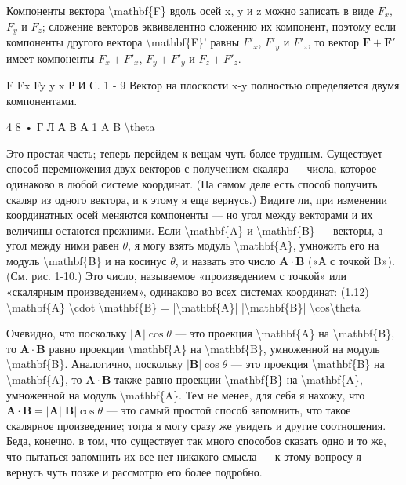 \documentclass[10pt,oneside]{article}
\begin{document}
Компоненты вектора \textbackslash{}mathbf\{F\} вдоль осей x, y и z можно записать в виде \(F_x\), \(F_y\) и \(F_z\); сложение векторов эквивалентно сложению их компонент, поэтому если компоненты другого вектора \textbackslash{}mathbf\{F\}' равны \(F'_x\), \(F'_y\) и \(F'_z\), то вектор \(\mathbf{F} + \mathbf{F}'\) имеет компоненты \(F_x + F'_x\), \(F_y + F'_y\) и \(F_z + F'_z\).\par

F Fx Fy y x Р И С. 1 - 9 Вектор на плоскости x-y полностью определяется двумя компонентами.\par

4 8 • Г Л А В А   1 A B \textbackslash{}theta\par

Это простая часть; теперь перейдем к вещам чуть более трудным. Существует способ перемножения двух векторов с получением скаляра --- числа, которое одинаково в любой системе координат. (На самом деле есть способ получить скаляр из одного вектора, и к этому я еще вернусь.) Видите ли, при изменении координатных осей меняются компоненты --- но угол между векторами и их величины остаются прежними. Если \textbackslash{}mathbf\{A\} и \textbackslash{}mathbf\{B\} --- векторы, а угол между ними равен \(\theta\), я могу взять модуль \textbackslash{}mathbf\{A\}, умножить его на модуль \textbackslash{}mathbf\{B\} и на косинус \(\theta\), и назвать это число \(\mathbf{A} \cdot \mathbf{B}\) («А с точкой B»). (См. рис. 1-10.) Это число, называемое «произведением с точкой» или «скалярным произведением», одинаково во всех системах координат: (1.12) \textbackslash{}mathbf\{A\} \textbackslash{}cdot \textbackslash{}mathbf\{B\} = |\textbackslash{}mathbf\{A\}| |\textbackslash{}mathbf\{B\}| \textbackslash{}cos\textbackslash{}theta\par

Очевидно, что поскольку \(|\mathbf{A}| \cos\theta\) --- это проекция \textbackslash{}mathbf\{A\} на \textbackslash{}mathbf\{B\}, то \(\mathbf{A} \cdot \mathbf{B}\) равно проекции \textbackslash{}mathbf\{A\} на \textbackslash{}mathbf\{B\}, умноженной на модуль \textbackslash{}mathbf\{B\}. Аналогично, поскольку \(|\mathbf{B}| \cos\theta\) --- это проекция \textbackslash{}mathbf\{B\} на \textbackslash{}mathbf\{A\}, то \(\mathbf{A} \cdot \mathbf{B}\) также равно проекции \textbackslash{}mathbf\{B\} на \textbackslash{}mathbf\{A\}, умноженной на модуль \textbackslash{}mathbf\{A\}. Тем не менее, для себя я нахожу, что \(\mathbf{A} \cdot \mathbf{B} = |\mathbf{A}| |\mathbf{B}| \cos\theta\) --- это самый простой способ запомнить, что такое скалярное произведение; тогда я могу сразу же увидеть и другие соотношения. Беда, конечно, в том, что существует так много способов сказать одно и то же, что пытаться запомнить их все нет никакого смысла --- к этому вопросу я вернусь чуть позже и рассмотрю его более подробно.\par
\end{document}
